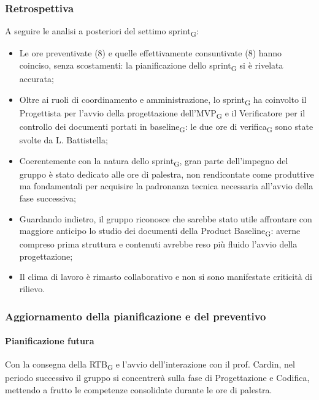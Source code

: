 \documentclass[a4paper, 10pt, colorlinks=true, linkcolor=black, urlcolor=blue, citecolor=blue, hidelinks]{article}
\begin{document}
\subsubsection{Retrospettiva}
A seguire le analisi a posteriori del settimo sprint\textsubscript{G}:
\begin{itemize}
    \item Le ore preventivate (8) e quelle effettivamente consuntivate (8) hanno coinciso, senza scostamenti: la pianificazione dello sprint\textsubscript{G} si è rivelata accurata;
    \item Oltre ai ruoli di coordinamento e amministrazione, lo sprint\textsubscript{G} ha coinvolto il Progettista per l'avvio della progettazione dell'MVP\textsubscript{G} e il Verificatore per il controllo dei documenti portati in baseline\textsubscript{G}: le due ore di verifica\textsubscript{G} sono state svolte da L. Battistella;
    \item Coerentemente con la natura dello sprint\textsubscript{G}, gran parte dell'impegno del gruppo è stato dedicato alle ore di palestra, non rendicontate come produttive ma fondamentali per acquisire la padronanza tecnica necessaria all'avvio della fase successiva;
    \item Guardando indietro, il gruppo riconosce che sarebbe stato utile affrontare con maggiore anticipo lo studio dei documenti della Product Baseline\textsubscript{G}: averne compreso prima struttura e contenuti avrebbe reso più fluido l'avvio della progettazione;
    \item Il clima di lavoro è rimasto collaborativo e non si sono manifestate criticità di rilievo.
\end{itemize}

\subsubsection{Aggiornamento della pianificazione e del preventivo}

\paragraph{Pianificazione futura}
Con la consegna della RTB\textsubscript{G} e l'avvio dell'interazione con il prof. Cardin, nel periodo successivo il gruppo si concentrerà sulla fase di Progettazione e Codifica, mettendo a frutto le competenze consolidate durante le ore di palestra.
\end{document}
